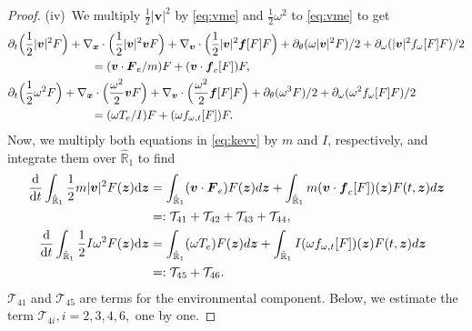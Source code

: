 \documentclass[a4paper,11pt]{article}
\numberwithin{equation}{section}
\theoremstyle{definition}
\newcommand{\bfx}{\boldsymbol{x}}
\newcommand{\bfz}{\boldsymbol{z}}
\newcommand{\bfv}{\boldsymbol{v}}
\newcommand{\bff}{\boldsymbol{f}}
\newcommand{\bfF}{\boldsymbol{F}}
\newcommand{\bbr}{\mathbb R}
\def\d{{  \rm d}}
\newcommand{\T}{\mathcal{T}}
\begin{document}
\begin{proof}
\vspace{0.1cm}
\noindent (iv)~We multiply $\frac{1}{2} |\bfv |^2$ by \eqref{eq:vme} and $\frac{1}{2} \omega^2$ to \eqref{eq:vme} to get
\begin{align}
\begin{aligned} \label{eq:kevv}
& \partial_t \Big(\frac{1}{2} |\bfv |^2 F \Big) +   \nabla_{\bfx} \cdot \Big (\frac{1}{2} |\bfv |^2 \bfv F \Big)  +  \nabla_{\bfv} \cdot  \Big (\frac{1}{2} |\bfv |^2 \bff[F] F  \Big ) + \partial_\theta (\omega |\bfv |^2 F)/2 +  \partial_{\omega} (|\bfv |^2 f_{\omega}[F] F)/2 \\
& \hspace{2.5cm} = (\bfv \cdot \bfF_e/m) F +  (\bfv \cdot \bff_{c}[F]) F, \\
& \partial_t \Big(\frac{1}{2} \omega^2 F \Big) +   \nabla_{\bfx} \cdot \Big (\frac{\omega^2}{2} \bfv F \Big)  +  \nabla_{\bfv} \cdot  \Big (\frac{\omega^2}{2}  \bff[F] F  \Big ) + \partial_\theta (\omega^3  F)/2 +  \partial_{\omega} (\omega^2 f_{\omega}[F] F)/2 \\
& \hspace{2.5cm} = (\omega T_e/I) F +  (\omega f_{\omega,t}[F]) F.
\end{aligned}
\end{align}
%
Now, we multiply both equations in \eqref{eq:kevv} by $m$ and $I$, respectively, and integrate them over $\hat{\bbr}_1$ to find 
\begin{align}
\begin{aligned} \label{eq:kevvww}
 \frac{\d}{\d t} \int_{\hat{\bbr}_1} \frac{1}{2} m|\bfv |^2 F(\bfz) \d \bfz &  = \int_{\hat{\bbr}_1}  (\bfv \cdot \bfF_e) F(\bfz)  d \bfz + \int_{\hat{\bbr}_1}   m(\bfv \cdot \bff_{c}[F])(\bfz) F(t,\bfz)   d \bfz 
 \\
&  =:  \T_{41} + \T_{42}+ \T_{43}+ \T_{44}, \\
 \frac{\d}{\d t} \int_{\hat{\bbr}_1} \frac{1}{2} I\omega^2 F(\bfz) \d \bfz &  = \int_{\hat{\bbr}_1}  (\omega T_e) F(\bfz)  d \bfz + \int_{\hat{\bbr}_1}   I(\omega f_{\omega,t}[F])(\bfz) F(t,\bfz)   d \bfz 
 \\
&  =:  \T_{45} + \T_{46}.
\end{aligned}
\end{align}
$\T_{41}$ and $\T_{45}$ are terms for the environmental component. 
Below, we estimate the term $\T_{4i}, i=2,3,4,6,$ one by one. \newline



\end{proof}
\end{document}
